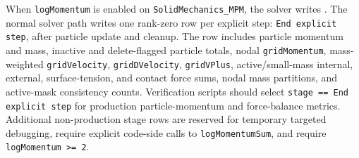 When \texttt{logMomentum} is enabled on \texttt{SolidMechanics\_MPM}, the solver writes .  The normal solver path writes one rank-zero row per explicit step: \texttt{End explicit step}, after particle update and cleanup.  The row includes particle momentum and mass, inactive and delete-flagged particle totals, nodal \texttt{gridMomentum}, mass-weighted \texttt{gridVelocity}, \texttt{gridDVelocity}, \texttt{gridVPlus}, active/small-mass internal, external, surface-tension, and contact force sums, nodal mass partitions, and active-mask consistency counts.  Verification scripts should select \texttt{stage == End explicit step} for production particle-momentum and force-balance metrics.  Additional non-production stage rows are reserved for temporary targeted debugging, require explicit code-side calls to \texttt{logMomentumSum}, and require \texttt{logMomentum >= 2}.
